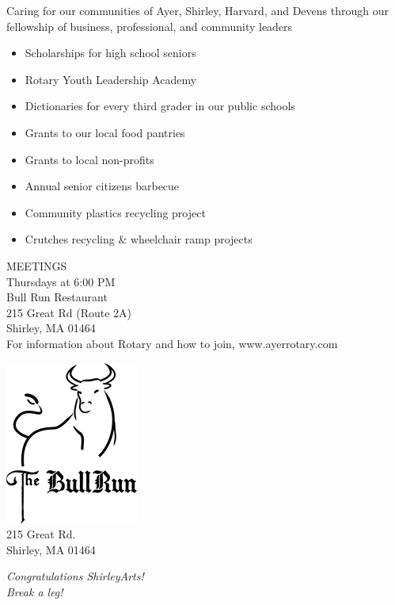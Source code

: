 \documentclass[12pt, a5paper, oneside]{article}
\begin{document}
Caring for our communities of Ayer, Shirley, Harvard, and Devens through our fellowship of business, professional, and community leaders 
\begin{itemize}
\setlength\itemsep{0.1em}
\item Scholarships for high school seniors 
\item Rotary Youth Leadership Academy 
\item Dictionaries for every third grader in our public schools 
\item Grants to our local food pantries 
\item Grants to local non-profits 
\item Annual senior citizens barbecue 
\item Community plastics recycling project 
\item Crutches recycling \& wheelchair ramp projects
\end{itemize} 
\center MEETINGS\\ 
Thursdays at 6:00 PM \\ 
Bull Run Restaurant\\215 Great Rd (Route 2A)\\
Shirley, MA 01464 \\
For information about Rotary and how to join,
www.ayerrotary.com \\
\pagebreak
\begin{framed}
\begin{minipage}[c][0.5\textheight]{0.4\linewidth}
	\centering
    \includegraphics[scale=0.5]{media/bull-logo_black_sm.png}\\
    \small{215 Great Rd.\\
    Shirley, MA 01464}
\end{minipage}
\begin{minipage}[c][0.5\textheight]{0.4\linewidth}
\centering
   \Large \textit{Congratulations ShirleyArts!\\
   Break a leg!}
\end{minipage}
\end{framed}
\end{document}

